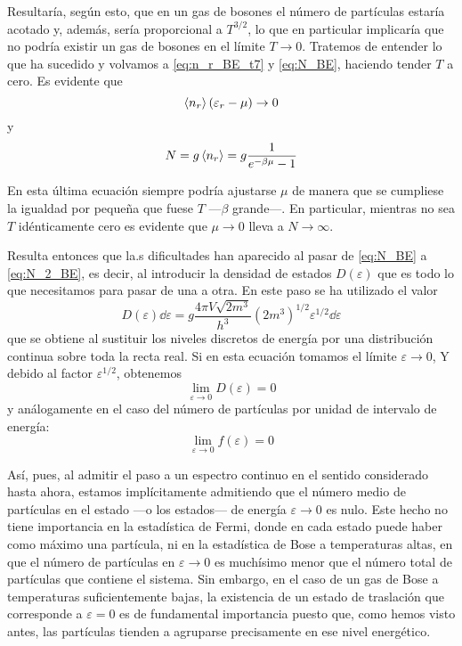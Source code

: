 Resultaría, según esto, que en un gas de bosones el número de partículas estaría acotado y, además, sería proporcional a $T^{3/2}$, lo que en particular implicaría que no podría existir un gas de bosones en el límite $T \rightarrow 0$.
Tratemos de entender lo que ha sucedido y volvamos a \eqref{eq:n_r_BE_t7} y \eqref{eq:N_BE}, haciendo tender $T$ a cero. Es evidente que
$$\expval{n_r}(\varepsilon_r - \mu) \rightarrow 0$$
y
$$N = g\expval{n_r} = g \frac{1}{e^{-\beta\mu} - 1}$$

En esta última ecuación siempre podría ajustarse $\mu$ de manera que se cumpliese la igualdad por pequeña que fuese $T$ ---$\beta$ grande---.
En particular, mientras no sea $T$ idénticamente cero es evidente que $\mu \rightarrow 0$ lleva a $N \rightarrow \infty$.

Resulta entonces que la.s dificultades han aparecido al pasar de \eqref{eq:N_BE} a \eqref{eq:N_2_BE}, es decir, al introducir la densidad de estados $D(\varepsilon)$ que es todo lo que necesitamos para pasar de una a otra.
En este paso se ha utilizado el valor
\begin{equation}\label{eq:D_vareps_BE}
	D(\varepsilon) \dd{\varepsilon} = g \frac{4\pi V\sqrt{2m^3}}{h^3} (2m^3)^{1/2} \varepsilon^{1/2} \dd{\varepsilon}
\end{equation}
que se obtiene al sustituir los niveles discretos de energía por una distribución continua sobre toda la recta real.
Si en esta ecuación tomamos el límite $\varepsilon \rightarrow 0$, Y debido al factor $\varepsilon^{1/2}$, obtenemos
$$\lim\limits_{\varepsilon \rightarrow 0} D(\varepsilon) = 0$$
y análogamente en el caso del número de partículas por unidad de intervalo de energía:
$$\lim\limits_{\varepsilon \rightarrow 0} f(\varepsilon) = 0$$

Así, pues, al admitir el paso a un espectro continuo en el sentido considerado hasta ahora, estamos implícitamente admitiendo que el número medio de partículas en el estado ---o los estados--- de energía $\varepsilon \rightarrow 0$ es nulo.
Este hecho no tiene importancia en la estadística de Fermi, donde en cada estado puede haber como máximo una partícula, ni en la estadística de Bose a temperaturas altas, en que el número de partículas en $\varepsilon \rightarrow 0$ es muchísimo menor que el número total de partículas que contiene el sistema.
Sin embargo, en el caso de un gas de Bose a temperaturas suficientemente bajas, la existencia de un estado de traslación que corresponde a $\varepsilon = 0$ es de fundamental importancia puesto que, como hemos visto antes, las partículas tienden a agruparse precisamente en ese nivel energético.


